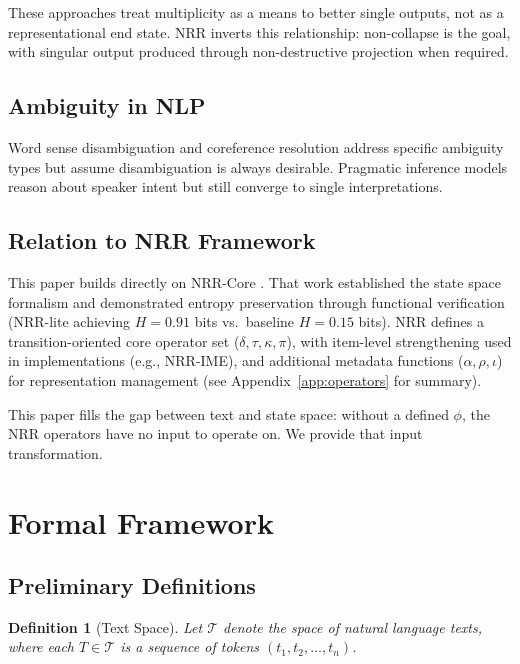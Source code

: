 \documentclass[11pt,a4paper]{article}
\newtheorem{definition}{Definition}
\begin{document}
These approaches treat multiplicity as a means to better single outputs, not as a 
representational end state. NRR inverts this relationship: non-collapse is the goal, 
with singular output produced through non-destructive projection when required.

\subsection{Ambiguity in NLP}

Word sense disambiguation \cite{navigli2009word} and coreference resolution 
\cite{lee2017end} address specific ambiguity types but assume disambiguation is 
always desirable. Pragmatic inference models \cite{goodman2016pragmatic} reason about 
speaker intent but still converge to single interpretations.

\subsection{Relation to NRR Framework}

This paper builds directly on NRR-Core \cite{saito2025nrr}. That work established 
the state space formalism and demonstrated entropy preservation through functional verification (NRR-lite achieving $H = 0.91$ bits vs.\ baseline $H = 0.15$ bits). 
NRR defines a transition-oriented core operator set ($\delta, \tau, \kappa, \pi$), with
item-level strengthening used in implementations (e.g., NRR-IME), and additional
metadata functions ($\alpha, \rho, \iota$) for representation management
(see Appendix~\ref{app:operators} for summary).

This paper fills the gap between text and state space: without a defined $\phi$, 
the NRR operators have no input to operate on. We provide that input transformation.

\section{Formal Framework}
\label{sec:framework}

\subsection{Preliminary Definitions}

\begin{definition}[Text Space]
Let $\mathcal{T}$ denote the space of natural language texts, where each 
$T \in \mathcal{T}$ is a sequence of tokens $(t_1, t_2, \ldots, t_n)$.
\end{definition}
\end{document}

